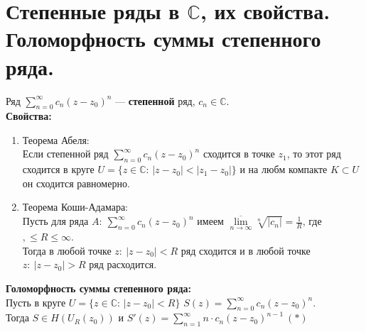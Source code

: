 \newpage
\section{Степенные ряды в $\mathbb{C}$, их свойства. Голоморфность суммы степенного ряда.}

Ряд $\sum_{n=0}^\infty c_n(z-z_0)^n$ --- \textbf{степенной} ряд, $c_n \in \mathbb{C}$.\\[2mm]

\textbf{Свойства:}
\begin{enumerate}
    \item Теорема Абеля:\\
    Если степенной ряд $\sum_{n=0}^\infty c_n(z-z_0)^n$ сходится в точке $z_1$, то этот ряд сходится в круге $U=\{z\in \mathbb{C}: \, |z-z_0|<|z_1-z_0|\}$ и на любм компакте $K \subset U$ он сходится равномерно.
    \item Теорема Коши-Адамара:\\
    Пусть для ряда $A: \ \sum_{n=0}^\infty c_n(z-z_0)^n$ имеем $\overline{\lim\limits_{n\to\infty}\limits}\sqrt[n]{|c_n|} = \frac{1}{R}$, где $,\leq R \leq \infty$.\\
    Тогда в любой точке $z: \ |z-z_0|<R$ ряд сходится и в любой точке $z: \ |z-z_0|>R$ ряд расходится.
\end{enumerate}

\textbf{Голоморфность суммы степенного ряда:}\\[2mm]
Пусть в круге $U=\{z\in \mathbb{C}: \, |z-z_0|<R\}$  $S(z) = \sum_{n=0}^\infty c_n (z-z_0)^n$.\\
Тогда $S \in H(U_R(z_0))$ и $S'(z)=\sum_{n=1}^\infty n\cdot c_n(z-z_0)^{n-1} \ (*)$

